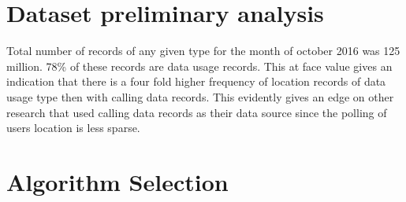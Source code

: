 \documentclass[12pt, a4paper]{report}
\theoremstyle{definition}
\theoremstyle{definition}%
\theoremstyle{definition}%
\theoremstyle{definition}%
\theoremstyle{definition}%
\theoremstyle{definition}%
\begin{document}
\begin{table}[h]
	\centering
\caption{Data Dictionary of mobile usage raw dataset} 
\end{table}


\section{Dataset preliminary analysis}

Total number of records of any given type for the month of october 2016 was 125 million. 78\% of these records are data usage records. This at face value gives an indication that there is a four fold higher frequency of location records of data usage type then with calling data records. This evidently gives an edge on other research that used calling data records as their data source since the polling of users location is less sparse.



\section{Algorithm Selection}
\end{document}
